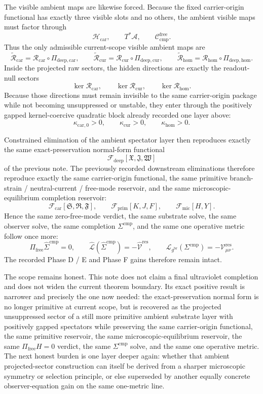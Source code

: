 \documentclass[11pt]{article}
\newcommand{\Sub}{\mathcal A}
\newcommand{\ObserverMetric}{g^{\mathrm{br}}}
\newcommand{\CompShift}{\Sigma^{\mathrm{cmp}}}
\newcommand{\CompLift}{\widehat\Sigma^{\mathrm{cmp}}}
\newcommand{\ResidualCore}{\mathcal V_{\mu\nu}^{\mathrm{res}}}
\newcommand{\ResidualLift}{\widehat{\mathcal V}^{\mathrm{res}}}
\newcommand{\SubReducedEin}{\widehat{\mathcal L}}
\newcommand{\FreeProj}{\Pi_{\mathrm{free}}}
\newcommand{\GaugeAux}{Y}
\newcommand{\ReducedEin}{\mathcal L_{\ObserverMetric}}
\newcommand{\CompFree}{\mathscr C_{\mathrm{cmp}}^{\mathrm{free}}}
\newcommand{\MicFunctional}{\mathscr F_{\mathrm{mic}}}
\newcommand{\PrimFunctional}{\mathscr F_{\mathrm{prim}}}
\newcommand{\CarrierFunctional}{\mathscr F_{\mathrm{car}}}
\newcommand{\DeepFunctional}{\mathscr F_{\mathrm{deep}}}
\newcommand{\PrimStrain}{K}
\newcommand{\PrimNeutral}{J}
\newcommand{\PrimFree}{F}
\newcommand{\CarrierClass}{\mathscr H_{\mathrm{car}}}
\newcommand{\CarrierSeed}{\mathfrak S}
\newcommand{\RelabelSeed}{\mathfrak R}
\newcommand{\FreeSeed}{\mathfrak F}
\newcommand{\PreCarGap}{\kappa_{\mathrm{car},0}}
\newcommand{\CurrentGap}{\kappa_{\mathrm{cur}}}
\newcommand{\HomGap}{\kappa_{\mathrm{hom}}}
\newcommand{\DeepTensor}{\mathfrak X}
\newcommand{\DeepRelabel}{\mathfrak J}
\newcommand{\DeepFree}{\mathfrak W}
\newcommand{\CarRead}{\mathcal R_{\mathrm{car}}}
\newcommand{\CurRead}{\mathcal R_{\mathrm{cur}}}
\newcommand{\HomRead}{\mathcal R_{\mathrm{hom}}}
\newcommand{\ProtoCarProj}{\Pi_{\mathrm{deep,car}}}
\newcommand{\ProtoCurProj}{\Pi_{\mathrm{deep,cur}}}
\newcommand{\ProtoHomProj}{\Pi_{\mathrm{deep,hom}}}
\newcommand{\ProtoCarRead}{\widetilde{\mathcal R}_{\mathrm{car}}}
\newcommand{\ProtoCurRead}{\widetilde{\mathcal R}_{\mathrm{cur}}}
\newcommand{\ProtoHomRead}{\widetilde{\mathcal R}_{\mathrm{hom}}}
\begin{document}
The visible ambient maps are likewise forced. Because the fixed carrier-origin functional has exactly three visible slots and no others, the ambient visible maps must factor through
\[
\CarrierClass,\qquad
T^*\Sub,\qquad
\CompFree.
\]
Thus the only admissible current-scope visible ambient maps are
\[
\ProtoCarRead=\CarRead\circ\ProtoCarProj,
\qquad
\ProtoCurRead=\CurRead\circ\ProtoCurProj,
\qquad
\ProtoHomRead=\HomRead\circ\ProtoHomProj.
\]
Inside the projected raw sectors, the hidden directions are exactly the readout-null sectors
\[
\ker\CarRead,\qquad
\ker\CurRead,\qquad
\ker\HomRead.
\]
Because those directions must remain invisible to the same carrier-origin package while not becoming unsuppressed or unstable, they enter through the positively gapped kernel-coercive quadratic block already recorded one layer above:
\[
\PreCarGap>0,\qquad
\CurrentGap>0,\qquad
\HomGap>0.
\]

Constrained elimination of the ambient spectator layer then reproduces exactly the same exact-preservation normal-form functional
\[
\DeepFunctional[\DeepTensor,\DeepRelabel,\DeepFree]
\]
of the previous note. The previously recorded downstream eliminations therefore reproduce exactly the same carrier-origin functional, the same primitive branch-strain / neutral-current / free-mode reservoir, and the same microscopic-equilibrium completion reservoir:
\[
\CarrierFunctional[\CarrierSeed,\RelabelSeed,\FreeSeed],
\qquad
\PrimFunctional[\PrimStrain,\PrimNeutral,\PrimFree],
\qquad
\MicFunctional[H,\GaugeAux].
\]
Hence the same zero-free-mode verdict, the same substrate solve, the same observer solve, the same completion \(\Sigma^{\mathrm{cmp}}\), and the same one operative metric follow once more:
\[
\FreeProj\CompLift=0,
\qquad
\SubReducedEin(\CompLift)=-\ResidualLift,
\qquad
\ReducedEin(\CompShift)=-\ResidualCore.
\]
The recorded Phase D / E and Phase F gains therefore remain intact.

The scope remains honest. This note does not claim a final ultraviolet completion and does not widen the current theorem boundary. Its exact positive result is narrower and precisely the one now needed: the exact-preservation normal form is no longer primitive at current scope, but is recovered as the projected unsuppressed sector of a still more primitive ambient substrate layer with positively gapped spectators while preserving the same carrier-origin functional, the same primitive reservoir, the same microscopic-equilibrium reservoir, the same \(\Pi_{\mathrm{free}}H=0\) verdict, the same \(\Sigma^{\mathrm{cmp}}\) solve, and the same one operative metric. The next honest burden is one layer deeper again: whether that ambient projected-sector construction can itself be derived from a sharper microscopic symmetry or selection principle, or else superseded by another equally concrete observer-equation gain on the same one-metric line.
\end{document}
